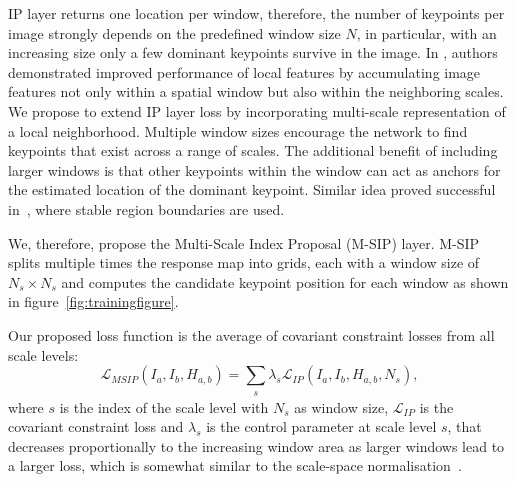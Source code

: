 IP layer returns one location per window, therefore, the number of keypoints per image strongly depends on the predefined window size $N$, in particular, with an increasing size only a few dominant keypoints survive in the image.
In \cite{DSPSIFT_soatto}, authors demonstrated improved performance of local features by accumulating image features not only within a spatial window but also within the neighboring scales.
We propose to extend IP layer loss by incorporating multi-scale representation of a local neighborhood. Multiple window sizes encourage the network to find keypoints that exist across a range of scales. The additional benefit of including larger windows is that other keypoints within the window can act as anchors for the estimated location of the dominant keypoint. Similar idea proved successful in~\cite{Local_affine_frames_Matas}, where stable region boundaries are used. 

We, therefore, propose the Multi-Scale Index Proposal (M-SIP) layer. 
M-SIP splits multiple times the response map into grids, each with a window size of $N_s \times N_s$ and computes the candidate keypoint position for each window as shown in figure~\ref{fig:trainingfigure}.  

Our proposed loss function is the average of covariant constraint losses from all scale levels: 
\begin{equation}
\mathcal{L}_{MSIP}(I_{a}, I_{b}, H_{a,b}) =  \sum_{\substack{s}}\lambda_{s} \mathcal{L}_{IP}(I_{a}, I_{b}, H_{a,b},N_s),
  \label{eq:context_losses_m}
\end{equation}
where $s$ is the index of the scale level with $N_s$ as window size, $\mathcal{L}_{IP}$ is the covariant constraint loss and $\lambda_{s}$ is the control parameter at scale level $s$, that decreases proportionally to the increasing window area as larger windows lead to a larger loss, which is somewhat similar to the scale-space normalisation~\cite{mikolajczykIJCV2004}. \par 

